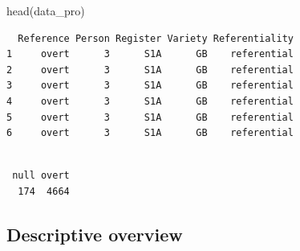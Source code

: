 \documentclass[
  11pt,
  letterpaper,
  DIV=11,
  numbers=noendperiod]{scrreprt}
\newenvironment{Shaded}{\begin{snugshade}}{\end{snugshade}}
\newcommand{\FunctionTok}[1]{\textcolor[rgb]{0.28,0.35,0.67}{#1}}
\newcommand{\NormalTok}[1]{\textcolor[rgb]{0.00,0.23,0.31}{#1}}
\newcommand{\SpecialCharTok}[1]{\textcolor[rgb]{0.37,0.37,0.37}{#1}}
\begin{document}
\begin{Shaded}
\begin{Highlighting}[]
\FunctionTok{head}\NormalTok{(data\_pro)}
\end{Highlighting}
\end{Shaded}

\begin{verbatim}
  Reference Person Register Variety Referentiality
1     overt      3      S1A      GB    referential
2     overt      3      S1A      GB    referential
3     overt      3      S1A      GB    referential
4     overt      3      S1A      GB    referential
5     overt      3      S1A      GB    referential
6     overt      3      S1A      GB    referential
\end{verbatim}

\begin{Shaded}
\end{Shaded}

\begin{verbatim}

 null overt 
  174  4664 
\end{verbatim}

\subsection{Descriptive overview}\label{descriptive-overview-1}
\end{document}
